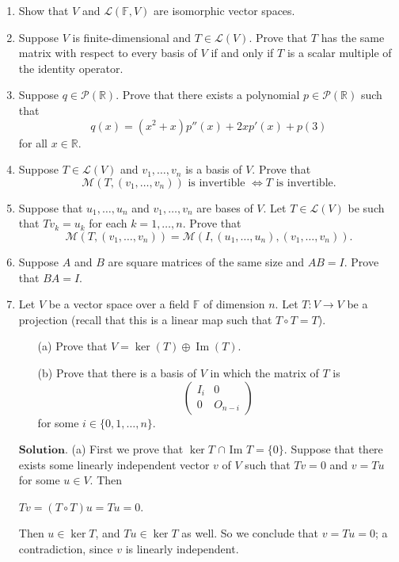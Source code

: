 \documentclass{article}
\theoremstyle{remark}
\begin{document}
\begin{enumerate}
        \item Show that $V$ and $\mathcal{L}(\mathbb{F}, V)$ are isomorphic vector spaces.
        
        \item Suppose $V$ is finite-dimensional and $T \in \mathcal{L}(V)$. Prove that $T$ has the same matrix with respect to every basis of $V$ if and only if $T$ is a scalar multiple of the identity operator.
        
        \item Suppose $q \in \mathcal{P}(\mathbb{R})$. Prove that there exists a polynomial $p \in \mathcal{P}(\mathbb{R})$ such that
        \[
        q(x) = (x^2 + x)p''(x) + 2x p'(x) + p(3)
        \]
        for all $x \in \mathbb{R}$.
        
        \item Suppose $T \in \mathcal{L}(V)$ and $v_1, \dots, v_n$ is a basis of $V$. Prove that
        \[
        \mathcal{M}(T, (v_1, \dots, v_n)) \text{ is invertible } \iff T \text{ is invertible.}
        \]
        
        \item Suppose that $u_1, \dots, u_n$ and $v_1, \dots, v_n$ are bases of $V$. Let $T \in \mathcal{L}(V)$ be such that $Tv_k = u_k$ for each $k = 1, \dots, n$. Prove that
        \[
        \mathcal{M}(T, (v_1, \dots, v_n)) = \mathcal{M}(I, (u_1, \dots, u_n), (v_1, \dots, v_n)).
        \]
        
        \item Suppose $A$ and $B$ are square matrices of the same size and $AB = I$. Prove that $BA = I$.
        
        \item Let $V$ be a vector space over a field $\mathbb{F}$ of dimension $n$. Let $T \colon V \to V$ be a projection (recall that this is a linear map such that $T \circ T = T$).

        \begin{enumerate}
            \item[(a)] Prove that $V = \ker(T) \oplus \operatorname{Im}(T)$.
            \item[(b)] Prove that there is a basis of $V$ in which the matrix of $T$ is
            \[
            \begin{pmatrix}
            I_i & 0 \\
            0 & O_{n-i}
            \end{pmatrix}
            \]
            for some $i \in \{0, 1, \dots, n\}$.
        \end{enumerate}
        $\textbf{Solution.}$ (a) First we prove that $\ker T$ $\cap$ Im $T = \{0\}$.
        Suppose that there exists some linearly independent vector $v$ of $V$ such that 
        $Tv = 0$ and $v = Tu$ for some $u \in V$. Then
        \begin{center}
            $Tv = (T\circ T) u = Tu = 0$.
        \end{center}
        Then $u \in \ker T$, and $Tu \in \ker T$ as well. So we conclude that $v = Tu = 0$; a contradiction, since $v$ is linearly independent.


\end{enumerate}
\end{document}

